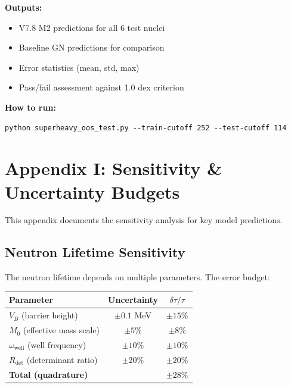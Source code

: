 \documentclass[11pt,a4paper]{article}
\begin{document}
\textbf{Outputs:}
\begin{itemize}[nosep]
    \item V7.8 M2 predictions for all 6 test nuclei
    \item Baseline GN predictions for comparison
    \item Error statistics (mean, std, max)
    \item Pass/fail assessment against 1.0 dex criterion
\end{itemize}

\textbf{How to run:}
\begin{verbatim}
python superheavy_oos_test.py --train-cutoff 252 --test-cutoff 114
\end{verbatim}

\section{Appendix I: Sensitivity \& Uncertainty Budgets}
\label{app:sensitivity}

This appendix documents the sensitivity analysis for key model predictions.

\subsection{Neutron Lifetime Sensitivity}

The neutron lifetime depends on multiple parameters. The error budget:

\begin{center}
\begin{tabular}{lcc}
\toprule
\textbf{Parameter} & \textbf{Uncertainty} & \textbf{$\delta\tau/\tau$} \\
\midrule
$V_B$ (barrier height) & $\pm 0.1$ MeV & $\pm 15\%$ \\
$M_0$ (effective mass scale) & $\pm 5\%$ & $\pm 8\%$ \\
$\omega_{\text{well}}$ (well frequency) & $\pm 10\%$ & $\pm 10\%$ \\
$R_{\text{det}}$ (determinant ratio) & $\pm 20\%$ & $\pm 20\%$ \\
\midrule
\textbf{Total (quadrature)} & & $\pm 28\%$ \\
\bottomrule
\end{tabular}
\end{center}
\end{document}
